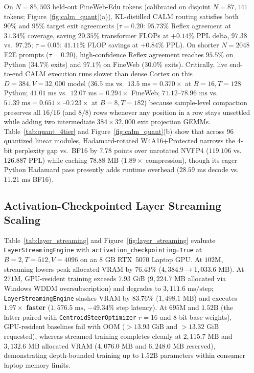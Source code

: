 \documentclass[10pt,twocolumn,letterpaper]{article}
\begin{document}
On $N=85,503$ held-out FineWeb-Edu tokens (calibrated on disjoint $N=87,141$ tokens; Figure~\ref{fig:calm_quant}(a)), KL-distilled CALM routing satisfies both $90\%$ and $95\%$ target exit agreements ($\tau=0.20$: $95.73\%$ Reflex agreement at $31.34\%$ coverage, saving $20.35\%$ transformer FLOPs at $+0.14\%$ PPL delta, $97.38$ vs.\ $97.25$; $\tau=0.05$: $41.11\%$ FLOP savings at $+0.84\%$ PPL). On shorter $N=2048$ E2E prompts ($\tau=0.20$), high-confidence Reflex agreement reaches $95.5\%$ on Python ($34.7\%$ exits) and $97.1\%$ on FineWeb ($30.0\%$ exits). Critically, live end-to-end CALM execution runs slower than dense Cortex on this $D=384, V=32,000$ model ($36.5\text{ ms}$ vs.\ $13.5\text{ ms} = 0.370\times$ at $B=16, T=128$ Python; $41.01\text{ ms}$ vs.\ $12.07\text{ ms} = 0.294\times$ FineWeb; $71.12\text{--}78.96\text{ ms}$ vs.\ $51.39\text{ ms} = 0.651\times\text{--}0.723\times$ at $B=8, T=182$) because sample-level compaction preserves all $16/16$ (and $8/8$) rows whenever any position in a row stays unsettled while adding two intermediate $384 \times 32,000$ exit projection GEMMs. Table~\ref{tab:quant_4tier} and Figure~\ref{fig:calm_quant}(b) show that across $96$ quantized linear modules, Hadamard-rotated W4A16+Protected narrows the 4-bit perplexity gap vs.\ BF16 by $7.78$ points over unrotated NVFP4 ($119.106$ vs.\ $126.887$ PPL) while caching $78.88\text{ MB}$ ($1.89\times$ compression), though its eager Python Hadamard pass presently adds runtime overhead ($28.59\text{ ms}$ decode vs.\ $11.21\text{ ms}$ BF16).

\subsection{Activation-Checkpointed Layer Streaming Scaling}

Table~\ref{tab:layer_streaming} and Figure~\ref{fig:layer_streaming} evaluate \texttt{LayerStreamingEngine} with \texttt{activation\_checkpointing=True} at $B=2, T=512, V=4096$ on an $8\text{ GB}$ RTX~5070 Laptop GPU. At $102\text{M}$, streaming lowers peak allocated VRAM by $76.43\%$ ($4,384.9 \to 1,033.6\text{ MB}$). At $271\text{M}$, GPU-resident training exceeds $7.93\text{ GiB}$ ($9,224.7\text{ MB}$ allocated via Windows WDDM oversubscription) and degrades to $3,111.6\text{ ms/step}$; \texttt{LayerStreamingEngine} slashes VRAM by $83.76\%$ ($1,498.1\text{ MB}$) and executes \textbf{$1.97\times$ faster} ($1,576.5\text{ ms}$, $-49.34\%$ step latency). At $695\text{M}$ and $1.52\text{B}$ (the latter paired with \texttt{CentroidSteerOptimizer} $r=16$ and 8-bit base weights), GPU-resident baselines fail with OOM ($>13.93\text{ GiB}$ and $>13.32\text{ GiB}$ requested), whereas streamed training completes cleanly at $2,115.7\text{ MB}$ and $3,132.6\text{ MB}$ allocated VRAM ($4,076.0\text{ MB}$ and $6,248.0\text{ MB}$ reserved), demonstrating depth-bounded training up to $1.52\text{B}$ parameters within consumer laptop memory limits.
\end{document}
